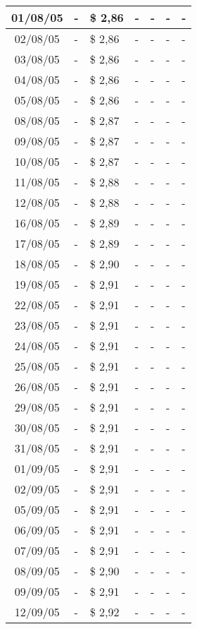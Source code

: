 \begin{center}
\begin{longtable}{|c|p{1.5cm}|p{1.5cm}|p{1.5cm}|p{1.5cm}|p{1.5cm}|p{1.5cm}|}
01/08/05 & - & \$ 2,86 & - & - & - & - \\ \hline
02/08/05 & - & \$ 2,86 & - & - & - & - \\ \hline
03/08/05 & - & \$ 2,86 & - & - & - & - \\ \hline
04/08/05 & - & \$ 2,86 & - & - & - & - \\ \hline
05/08/05 & - & \$ 2,86 & - & - & - & - \\ \hline
08/08/05 & - & \$ 2,87 & - & - & - & - \\ \hline
09/08/05 & - & \$ 2,87 & - & - & - & - \\ \hline
10/08/05 & - & \$ 2,87 & - & - & - & - \\ \hline
11/08/05 & - & \$ 2,88 & - & - & - & - \\ \hline
12/08/05 & - & \$ 2,88 & - & - & - & - \\ \hline
16/08/05 & - & \$ 2,89 & - & - & - & - \\ \hline
17/08/05 & - & \$ 2,89 & - & - & - & - \\ \hline
18/08/05 & - & \$ 2,90 & - & - & - & - \\ \hline
19/08/05 & - & \$ 2,91 & - & - & - & - \\ \hline
22/08/05 & - & \$ 2,91 & - & - & - & - \\ \hline
23/08/05 & - & \$ 2,91 & - & - & - & - \\ \hline
24/08/05 & - & \$ 2,91 & - & - & - & - \\ \hline
25/08/05 & - & \$ 2,91 & - & - & - & - \\ \hline
26/08/05 & - & \$ 2,91 & - & - & - & - \\ \hline
29/08/05 & - & \$ 2,91 & - & - & - & - \\ \hline
30/08/05 & - & \$ 2,91 & - & - & - & - \\ \hline
31/08/05 & - & \$ 2,91 & - & - & - & - \\ \hline
01/09/05 & - & \$ 2,91 & - & - & - & - \\ \hline
02/09/05 & - & \$ 2,91 & - & - & - & - \\ \hline
05/09/05 & - & \$ 2,91 & - & - & - & - \\ \hline
06/09/05 & - & \$ 2,91 & - & - & - & - \\ \hline
07/09/05 & - & \$ 2,91 & - & - & - & - \\ \hline
08/09/05 & - & \$ 2,90 & - & - & - & - \\ \hline
09/09/05 & - & \$ 2,91 & - & - & - & - \\ \hline
12/09/05 & - & \$ 2,92 & - & - & - & - \\ \hline

\end{longtable}
\end{center}
